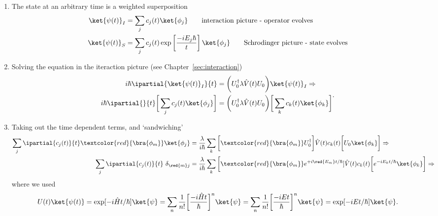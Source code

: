 \begin{enumerate}
	\item The state at an arbitrary time is a weighted superposition
	\begin{equation}
		\label{eqn:pertStates}
		\begin{aligned}
		\ket{\psi(t)}_I & = \sum_j c_j(t)\ket{\phi_j}\qquad\hfill\text{interaction picture - operator evolves}\\
		\ket{\psi(t)}_S & = \sum_j c_j(t)\exp\left[\frac{-iE_j\hbar}{t}\right]\ket{\phi_j}\qquad \hfill\text{Schrodinger picture - state evolves}
		\end{aligned}
	\end{equation} 
	\item Solving the \schrodinger equation in the iteraction picture (see Chapter~\ref{sec:interaction})
	\begin{equation}\label{key}
		\begin{aligned}
			i\hbar\ipartial{\ket{\psi(t)}_I}{t} & = \bigg(U_0^\dagger\lambda\hat{V}(t)U_0\bigg)\ket{\psi(t)}_I \Rightarrow\\
			i\hbar\ipartial{}{t}\bigg[\sum_j c_j(t)\ket{\phi_j}\bigg] & = \bigg(U_0^\dagger\lambda\hat{V}(t)U_0\bigg)\bigg[\sum_k c_k(t)\ket{\phi_k}\bigg]\\
		\end{aligned}.
	\end{equation}
	\item Taking out the time dependent terms, and `sandwiching'
	\begin{equation}\label{key}
		\begin{aligned}
		\sum_j \ipartial{c_j(t)}{t}\textcolor{red}{\bra{\phi_m}}\ket{\phi_j} & = \frac{\lambda}{i\hbar} \sum_k \bigg[ \textcolor{red}{\bra{\phi_m}}U_0^\dagger\bigg]\hat{V}(t)c_k(t)\bigg[U_0\ket{\phi_k}\bigg]\Rightarrow\\
		\sum_j \ipartial{c_j(t)}{t}\ \delta_{\red{m}j} & = \frac{\lambda}{i\hbar} \sum_k \bigg[ \textcolor{red}{\bra{\phi_m}}e^{+i\red{E_m}t/\hbar}]\hat{V}(t)c_k(t)\bigg[e^{-iE_kt/\hbar}\ket{\phi_k}\bigg] \Rightarrow\\
		\end{aligned}
	\end{equation}
	\noindent where we used
	\begin{equation}\label{key}
		U(t)\ket{\psi(t)} = \exp[-i\hat{H}t/\hbar]\ket{\psi} = \sum_n\frac{1}{n!}\bigg[\frac{-i\hat{H}t}{\hbar}\bigg]^n\ket{\psi} = \sum_n\frac{1}{n!}\bigg[\frac{-iEt}{\hbar}\bigg]^n\ket{\psi} = \exp[-iEt/\hbar]\ket{\psi}.
	\end{equation}

\end{enumerate}
